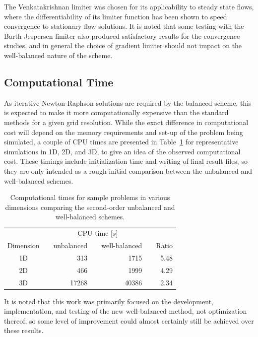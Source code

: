 The Venkatakrishnan limiter was chosen for its applicability to steady state flows, where the differentiability of its limiter function has been shown to speed convergence to stationary flow solutions. It is noted that some testing with the Barth-Jespersen limiter also produced satisfactory results for the convergence studies, and in general the choice of gradient limiter should not impact on the well-balanced nature of the scheme.

\subsection{Computational Time}
\label{subsec:timing}

As iterative Newton-Raphson solutions are required by the balanced scheme, this is expected to make it more computationally expensive than the standard methods for a given grid resolution. While the exact difference in computational cost will depend on the memory requirements and set-up of the problem being simulated, a couple of CPU times are presented in Table~\ref{table:timing} for representative simulations in 1D, 2D, and 3D, to give an idea of the observed computational cost. These timings include initialization time and writing of final result files, so they are only intended as a rough initial comparison between the unbalanced and well-balanced schemes.

\begin{table}\centering
\caption{Computational times for sample problems in various dimensions comparing the second-order unbalanced and well-balanced schemes.}
\label{table:timing}
\begin{tabular}{@{}crrrrrr@{}}\toprule
& \phantom{a} & \multicolumn{3}{c}{CPU time [$s$]} & \phantom{a} &\\
\cmidrule{3-5}
Dimension && unbalanced && well-balanced && Ratio\\ \midrule
1D && 313 && 1715 && 5.48\\
2D && 466 && 1999 && 4.29\\
3D && 17268 && 40386 && 2.34\\
\bottomrule
\end{tabular}
\end{table}

It is noted that this work was primarily focused on the development, implementation, and testing of the new well-balanced method, not optimization thereof, so some level of improvement could almost certainly still be achieved over these results.


